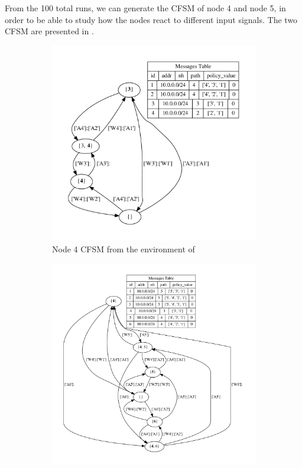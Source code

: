 From the \num{100} total runs, we can generate the \ac{CFSM} of node \num{4} and
node \num{5}, in order to be able to study how the nodes react to different
input signals.
The two \ac{CFSM} are presented in .

\begin{figure}[h]
     \centering
     \begin{subfigure}[b]{0.49\textwidth}
         \centering
         \includegraphics[width=\textwidth]{images/fsm/fig_4_4.pdf}
		 \caption{Node \num{4} \ac{CFSM} from the environment of }
         \label{fig:fsm_node4}
     \end{subfigure}
     \hfill
     \begin{subfigure}[b]{0.49\textwidth}
         \centering
         \includegraphics[width=\textwidth]{images/fsm/fig_4_5.pdf}

\end{subfigure}
\end{figure}

